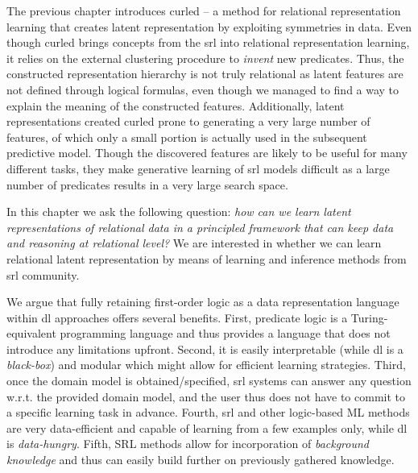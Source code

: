 The previous chapter introduces \gls{curled} -- a method for relational representation learning that creates latent representation by exploiting symmetries in data.
Even though \gls{curled} brings concepts from the \gls{srl} into relational representation learning, it relies on the external clustering procedure to \textit{invent} new predicates.
Thus, the constructed representation hierarchy  is not truly relational as latent features are not defined through logical formulas, even though we managed to find a way to explain the meaning of the constructed features.
Additionally, latent representations created \gls{curled} prone to generating a very large number of features, of which only a small portion  is actually used in the subsequent predictive model.
Though the discovered features are likely to be useful for many different tasks, they make generative learning of \gls{srl} models difficult as a large number of predicates results in a very large search space.





In this chapter we ask the following question: \textit{how can we learn latent representations of relational data in a principled framework that can keep data and reasoning at relational level?}
We are interested in whether we can learn relational latent representation by means of learning and inference methods from \gls{srl} community.



We argue that fully retaining first-order logic as a data representation language within \gls{dl} approaches offers several benefits.
First, predicate logic is a Turing-equivalent programming language and thus provides a language that does not introduce any limitations upfront.
Second, it is easily interpretable (while \gls{dl} is a \textit{black-box}) and modular which might allow for efficient learning strategies.
Third, once the domain model is obtained/specified, \gls{srl} systems can answer any question w.r.t. the provided domain model, and the user thus does not have to commit to a specific learning task in advance.
Fourth, \gls{srl} and other logic-based ML methods are very data-efficient and capable of learning from a few examples only, while \gls{dl} is \textit{data-hungry}.
Fifth, SRL methods allow for incorporation of \textit{background knowledge} and thus can easily build further on previously gathered knowledge.






